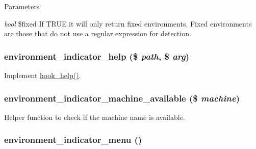 \begin{DoxyParams}{Parameters}
\item[{\em bool}]\$fixed If TRUE it will only return fixed environments. Fixed environments are those that do not use a regular expression for detection. \end{DoxyParams}
\hypertarget{environment__indicator_8module_adfcb16b3db44378c6a441b5fa7b551a6}{
\subsubsection[{environment\_\-indicator\_\-help}]{\setlength{\rightskip}{0pt plus 5cm}environment\_\-indicator\_\-help (\$ {\em path}, \/  \$ {\em arg})}}
\label{environment__indicator_8module_adfcb16b3db44378c6a441b5fa7b551a6}
Implement \hyperlink{group__hooks_ga5589c2714a782738e8851c4c90231f0e}{hook\_\-help()}. \hypertarget{environment__indicator_8module_ab2f10d13a885a023ba462bc38e2df00f}{
\subsubsection[{environment\_\-indicator\_\-machine\_\-available}]{\setlength{\rightskip}{0pt plus 5cm}environment\_\-indicator\_\-machine\_\-available (\$ {\em machine})}}
\label{environment__indicator_8module_ab2f10d13a885a023ba462bc38e2df00f}
Helper function to check if the machine name is available. \hypertarget{environment__indicator_8module_a2bd8a22de9eff55b8b81e063f715c60d}{
\subsubsection[{environment\_\-indicator\_\-menu}]{\setlength{\rightskip}{0pt plus 5cm}environment\_\-indicator\_\-menu ()}}
